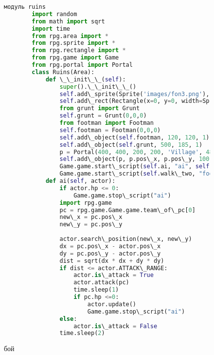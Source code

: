 \begin{figure}[H]
	\begin{lstlisting}[language=Python]
		модуль ruins
		import random
		from math import sqrt
		import time
		from rpg.area import *
		from rpg.sprite import *
		from rpg.rectangle import *
		from rpg.game import Game
		from rpg.portal import Portal
		class Ruins(Area):
			def \_\_init\_\_(self):
				super().\_\_init\_\_()
				self.add\_sprite(Sprite('images/fon3.png'), 590, 400, 0)
				self.add\_rect(Rectangle(x=0, y=0, width=Sprite('images/fon3.png').image.width(), height=Sprite('images/fon3.png').image.height()))
				from grunt import Grunt
				self.grunt = Grunt(0,0,0)
				from footman import Footman
				self.footman = Footman(0,0,0)
				self.add\_object(self.footman, 120, 120, 1)
				self.add\_object(self.grunt, 500, 185, 1)
				p = Portal(400, 400, 200, 200, 'Village', 480, 100)
				self.add\_object(p, p.pos\_x, p.pos\_y, 100)
				Game.game.start\_script(self.ai, "ai", self.grunt)
				Game.game.start\_script(self.walk\_two, "footman", 50, 50)	
			def ai(self, actor):
				if actor.hp <= 0:
					Game.game.stop\_script("ai")
				import rpg.game
				pc = rpg.game.Game.game.team\_of\_pc[0]
				new\_x = pc.pos\_x
				new\_y = pc.pos\_y
				
				actor.search\_position(new\_x, new\_y)
				dx = pc.pos\_x - actor.pos\_x
				dy = pc.pos\_y - actor.pos\_y
				dist = sqrt(dx * dx + dy * dy)
				if dist <= actor.ATTACK\_RANGE:
					actor.is\_attack = True
					actor.attack(pc)
					time.sleep(1)
					if pc.hp <=0:
						actor.update()
						Game.game.stop\_script("ai")
				else:
					actor.is\_attack = False
				time.sleep(2)
\end{lstlisting}  
\caption{бой}
\label{battle2:image}
\end{figure}
